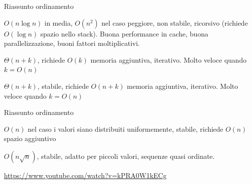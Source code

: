 \begin{frame}{Riassunto ordinamento}

\vspace{-9pt}
\begin{myboxtitle}
$O(n\log n)$ in media, $O(n^2)$ nel caso peggiore, non stabile, ricorsivo (richiede $O(\log n)$ spazio nello stack). Buona performance in cache, buona parallelizzazione, buoni fattori moltiplicativi.
\end{myboxtitle}
\begin{myboxtitle}
$\Theta(n+k)$, richiede $O(k)$ memoria aggiuntiva, iterativo. Molto veloce quando $k=O(n)$
\end{myboxtitle}
\begin{myboxtitle}
$\Theta(n+k)$, stabile, richiede $O(n+k)$ memoria aggiuntiva, iterativo. Molto veloce quando $k=O(n)$
\end{myboxtitle}
\end{frame}%

\begin{frame}{Riassunto ordinamento}
    
\vspace{-9pt}
\begin{myboxtitle}
$O(n)$ nel caso i valori siano distribuiti uniformemente, stabile, richiede $O(n)$ spazio aggiuntivo
\end{myboxtitle}

\begin{myboxtitle}
$O(n \sqrt{n})$, stabile, adatto per piccoli valori, sequenze quasi ordinate.
\end{myboxtitle}

\bigskip
\begin{myboxtitle}
\url{https://www.youtube.com/watch?v=kPRA0W1kECg}
\end{myboxtitle}


\end{frame}%

